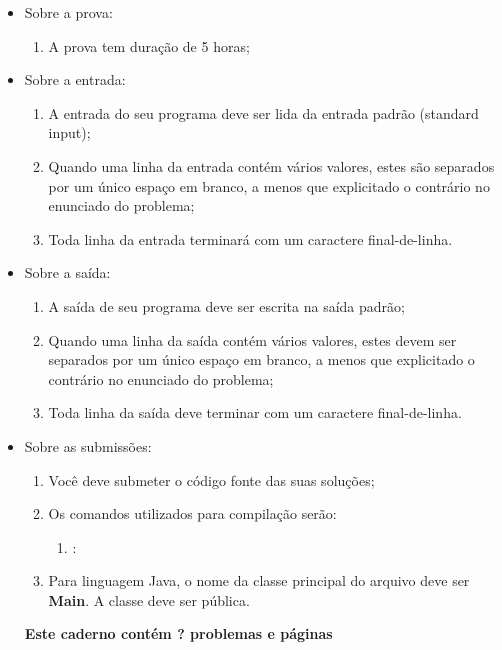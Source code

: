 \documentclass[titlepage, oneside, a4paper]{article}
\title{\VAR{contest.name or ""}}
\author{\VAR{contest.location or ""}}
\date{\VAR{contest.date or ""}}
\title{}
\author{}
\date{}
\makeatletter
\let\newtitle\@title
\let\newauthor\@author
\let\newdate\@date
\makeatother
\begin{document}
\begin{frontpage}{\newtitle}{\newauthor}{\newdate}
\begin{itemize}
\item Sobre a prova:
\begin{enumerate}
\item A prova tem duração de 5 horas;
\end{enumerate}
\item Sobre a entrada:
\begin{enumerate}
\item A entrada do seu programa deve ser lida da entrada padrão (standard input);
\item Quando uma linha da entrada contém vários valores, estes são separados por um único espaço em branco, a menos que explicitado o contrário no enunciado do problema;
\item Toda linha da entrada terminará com um caractere final-de-linha.
\end{enumerate}

\item Sobre a saída:
\begin{enumerate}
\item A saída de seu programa deve ser escrita na saída padrão;
\item Quando uma linha da saída contém vários valores, estes devem ser separados por um único espaço em branco, a menos que explicitado o contrário no enunciado do problema;
\item Toda linha da saída deve terminar com um caractere final-de-linha.
\end{enumerate}

\item Sobre as submissões:
\begin{enumerate}
\item Você deve submeter o código fonte das suas soluções;
\item Os comandos utilizados para compilação serão:
\begin{enumerate}
\item {}: 
\end{enumerate}
\item Para linguagem Java, o nome da classe principal do arquivo deve ser \textbf{Main}. A classe deve ser pública.
\end{enumerate}
\centering\vspace*{\fill}\textbf{Este caderno contém ? problemas e \pageref{LastPage} páginas} \\
\vspace*{\fill}
\end{itemize}
\end{frontpage}
\end{document}

